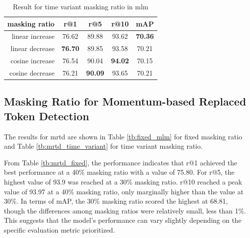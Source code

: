 \begin{table}[htbp]
  \centering
  \caption{Result for time variant masking ratio in \acrshort{mlm}}
  \label{tb:time_variant_mlm}
  \begin{tabular}{rcccc}
    \centering
    masking ratio & r@1 & r@5 & r@10 & mAP\\ \hline
    linear increase & 76.62 & 89.88 & 93.62 & \textbf{70.36} \\
    linear decrease & \textbf{76.70} & 89.85 & 93.58 & 70.21 \\
    cosine increase & 76.54 & 90.04 & \textbf{94.02} & 70.15 \\
    cosine decrease & 76.21 & \textbf{90.09} & 93.65 & 70.21 \\
  \end{tabular}
\end{table}


\subsection{Masking Ratio for Momentum-based Replaced Token Detection}



The results for \acrshort{mrtd} are shown in Table \ref{tb:fixed_mlm} for fixed masking ratio and Table \ref{tb:mrtd_time_variant} for time variant masking ratio.

From Table \ref{tb:mrtd_fixed}, the performance indicates that r@1 achieved the best performance at a 40\% masking ratio with a value of 75.80. For r@5, the highest value of 93.9 was reached at a 30\% masking ratio. r@10 reached a peak value of 93.97 at a 40\% masking ratio, only marginally higher than the value at 30\%. In terms of mAP, the 30\% masking ratio scored the highest at 68.81, though the differences among masking ratios were relatively small, less than 1\%. This suggests that the model's performance can vary slightly depending on the specific evaluation metric prioritized.

